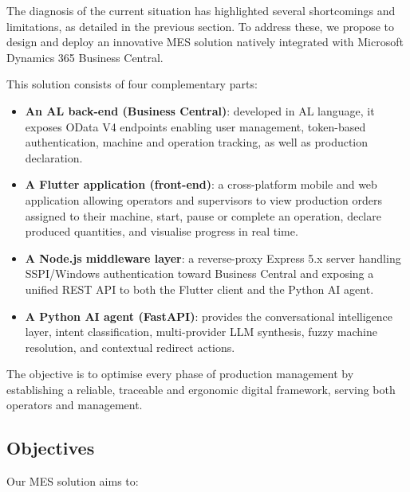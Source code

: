 The diagnosis of the current situation has highlighted several shortcomings and
limitations, as detailed in the previous section. To address these, we propose to
design and deploy an innovative MES solution natively integrated with Microsoft
Dynamics 365 Business Central.

This solution consists of four complementary parts:

\begin{itemize}
	\item \textbf{An AL back-end (Business Central)}: developed in AL language, it
	      exposes OData V4 endpoints enabling user management, token-based authentication,
	      machine and operation tracking, as well as production declaration.
	\item \textbf{A Flutter application (front-end)}: a cross-platform mobile and web
	      application allowing operators and supervisors to view production orders assigned to
	      their machine, start, pause or complete an operation, declare produced quantities,
	      and visualise progress in real time.
	\item \textbf{A Node.js middleware layer}: a reverse-proxy Express 5.x server
	      handling SSPI/Windows authentication toward Business Central and exposing
	      a unified REST API to both the Flutter client and the Python AI agent.
	\item \textbf{A Python AI agent (FastAPI)}: provides the conversational
	      intelligence layer, intent classification, multi-provider
	      LLM synthesis, fuzzy machine resolution, and contextual redirect actions.
\end{itemize}

The objective is to optimise every phase of production management by establishing a
reliable, traceable and ergonomic digital framework, serving both operators and
management.

\subsection{Objectives}

Our MES solution aims to:

